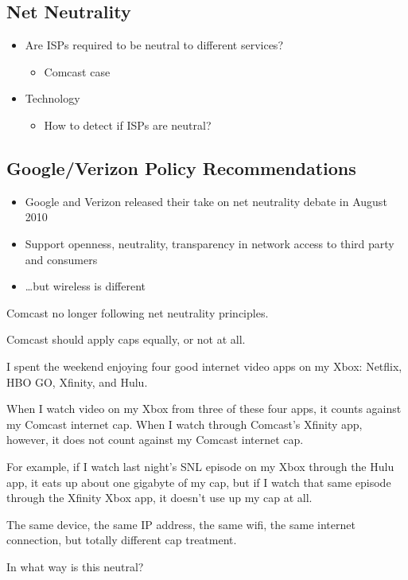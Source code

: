 \subsection{Net Neutrality}
\begin{itemize}[nosep]
    \item Are ISPs required to be neutral to different services?
          \begin{itemize}[nosep]
              \item Comcast case
          \end{itemize}
    \item Technology
          \begin{itemize}[nosep]
              \item How to detect if ISPs are neutral?
          \end{itemize}
\end{itemize}

\subsection{Google/Verizon Policy Recommendations}
\begin{itemize}[nosep]
    \item Google and Verizon released their take on net neutrality debate in August 2010
    \item Support openness, neutrality, transparency in network access to third party and consumers
    \item \dots but wireless is different
\end{itemize}
\begin{tcolorbox}[colframe=red!40!white,colback=yellow!20,title={Facebook post by Reed Hastings, CEO of Netflix}]
    Comcast no longer following net neutrality principles.

    Comcast should apply caps equally, or not at all.

    I spent the weekend enjoying four good internet video apps on my Xbox: Netflix, HBO GO, Xfinity, and Hulu.

    When I watch video on my Xbox from three of these four apps, it counts against my Comcast internet cap. When I watch through Comcast’s Xfinity app, however, it does not count against my Comcast internet cap.

    For example, if I watch last night’s SNL episode on my Xbox through the Hulu app, it eats up about one gigabyte of my cap, but if I watch that same episode through the Xfinity Xbox app, it doesn’t use up my cap at all.

    The same device, the same IP address, the same wifi, the same internet connection, but totally different cap treatment.

    In what way is this neutral?
\end{tcolorbox}

